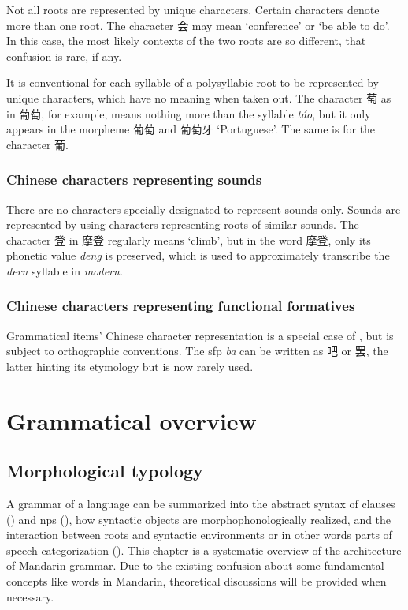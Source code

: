 \documentclass[UTF8, a4paper, oneside, scheme=plain, 12pt]{ctexrep}
\newcommand{\form}[1]{\emph{#1}}
\newcommand{\translate}[1]{`#1'}
\begin{document}
Not all roots are represented by unique characters.
Certain characters denote more than one root.
The character 会 may mean \translate{conference} or \translate{be able to do}. 
In this case, the most likely contexts of the two roots are so different,
that confusion is rare, if any.

It is conventional for each syllable of a polysyllabic root
to be represented by unique characters,
which have no meaning when taken out.
The character 萄 as in 葡萄, for example, 
means nothing more than the syllable \form{t\'{a}o},
but it only appears in the morpheme 葡萄 and 葡萄牙 \translate{Portuguese}.
The same is for the character 葡.

\subsection{Chinese characters representing sounds}\label{sec:writing.sound}

There are no characters specially designated to represent sounds only.
Sounds are represented by using characters representing roots of similar sounds.
The character 登 in 摩登 regularly means \translate{climb},
but in the word 摩登, only its phonetic value \form{d\={e}ng} is preserved,
which is used to approximately transcribe the \form{dern} syllable in \form{modern}.

\subsection{Chinese characters representing functional formatives}

Grammatical items' Chinese character representation
is a special case of ,
but is subject to orthographic conventions.
The \ac{sfp} \form{ba} can be written as 吧 or 罢,
the latter hinting its etymology but is now rarely used.

\chapter{Grammatical overview}

\section{Morphological typology}

A grammar of a language can be summarized into the abstract syntax of clauses () and \acfp{np} (),
how syntactic objects are morphophonologically realized,
and the interaction between roots and syntactic environments
or in other words parts of speech categorization
().
This chapter is a systematic overview of the architecture of Mandarin grammar.
Due to the existing confusion about some fundamental concepts like words in Mandarin,
theoretical discussions will be provided when necessary.
\end{document}
